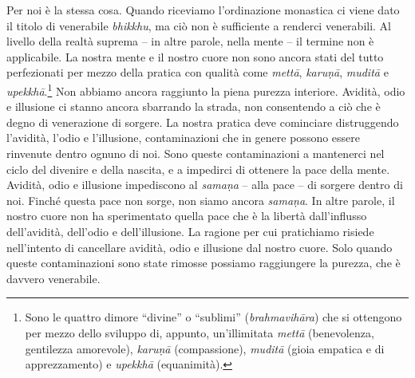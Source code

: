 Per noi è la stessa cosa. Quando riceviamo l'ordinazione monastica ci
viene dato il titolo di venerabile \emph{bhikkhu}, ma ciò non è
sufficiente a renderci venerabili. Al livello della realtà suprema -- in
altre parole, nella mente -- il termine non è applicabile. La nostra
mente e il nostro cuore non sono ancora stati del tutto perfezionati per
mezzo della pratica con qualità come \emph{mettā}, \emph{karuṇā},
\emph{muditā} e \emph{upekkhā}.\footnote{Sono le quattro dimore
  ``divine'' o ``sublimi'' (\emph{brahmavihāra}) che si ottengono per
  mezzo dello sviluppo di, appunto, un'illimitata \emph{mettā}
  (benevolenza, gentilezza amorevole), \emph{karuṇā} (compassione),
  \emph{muditā} (gioia empatica e di apprezzamento) e \emph{upekkhā}
  (equanimità).} Non abbiamo ancora raggiunto la piena purezza
interiore. Avidità, odio e illusione ci stanno ancora sbarrando la
strada, non consentendo a ciò che è degno di venerazione di sorgere. La
nostra pratica deve cominciare distruggendo l'avidità, l'odio e
l'illusione, contaminazioni che in genere possono essere rinvenute
dentro ognuno di noi. Sono queste contaminazioni a mantenerci nel ciclo
del divenire e della nascita, e a impedirci di ottenere la pace della
mente. Avidità, odio e illusione impediscono al \emph{samaṇa} -- alla
pace -- di sorgere dentro di noi. Finché questa pace non sorge, non
siamo ancora \emph{samaṇa}. In altre parole, il nostro cuore non ha
sperimentato quella pace che è la libertà dall'influsso dell'avidità,
dell'odio e dell'illusione. La ragione per cui pratichiamo risiede
nell'intento di cancellare avidità, odio e illusione dal nostro cuore.
Solo quando queste contaminazioni sono state rimosse possiamo
raggiungere la purezza, che è davvero venerabile.

